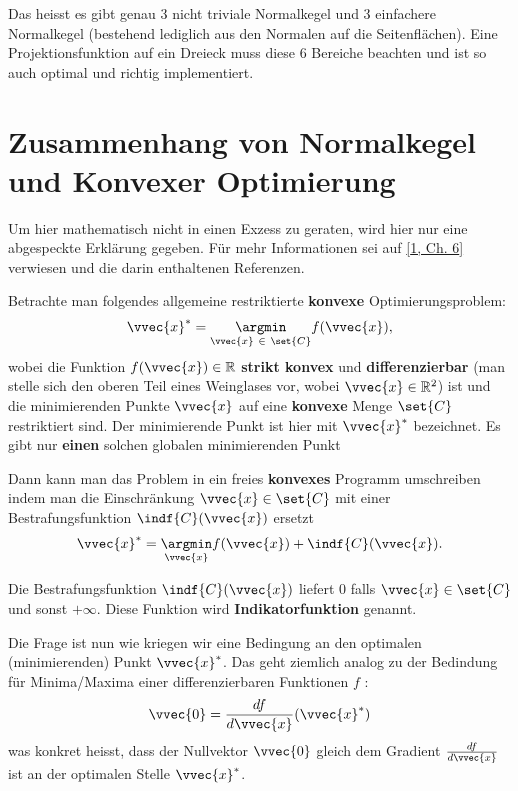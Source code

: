 \documentclass[
  12pt,
  british,
  a4paper,
  twoside,
  titlepage,
  openright,
  numbers=noenddot,
  chapterprefix=true,
  headings=optiontohead,
  svgnames,
  dvipsnames]{scrreprt}
\begin{document}
Das heisst es gibt genau 3 nicht triviale Normalkegel und 3 einfachere
Normalkegel (bestehend lediglich aus den Normalen auf die
Seitenflächen). Eine Projektionsfunktion auf ein Dreieck muss diese 6
Bereiche beachten und ist so auch optimal und richtig implementiert.

\hypertarget{zusammenhang-von-normalkegel-und-konvexer-optimierung}{%
\section{Zusammenhang von Normalkegel und Konvexer
Optimierung}\label{zusammenhang-von-normalkegel-und-konvexer-optimierung}}

Um hier mathematisch nicht in einen Exzess zu geraten, wird hier nur
eine abgespeckte Erklärung gegeben. Für mehr Informationen sei auf
\protect\hyperlink{ref-nuetzig_thesis_2016}{{[}1, Ch. 6{]}} verwiesen
und die darin enthaltenen Referenzen.

Betrachte man folgendes allgemeine restriktierte \textbf{konvexe}
Optimierungsproblem: \begin{align}
\vvec{x}^* = \underset{\vvec{x} \ \in \ \set{C}}{\argmin} f(\vvec{x}),
\label{eq:convexproblem}
\end{align} wobei die Funktion \(f(\vvec{x}) \in \mathbb{R}\)
\textbf{strikt konvex} und \textbf{differenzierbar} (man stelle sich den
oberen Teil eines Weinglases vor, wobei \(\vvec{x} \in \mathbb{R}^2\))
ist und die minimierenden Punkte \(\vvec{x}\) auf eine \textbf{konvexe}
Menge \(\set{C}\) restriktiert sind. Der minimierende Punkt ist hier mit
\(\vvec{x}^*\) bezeichnet. Es gibt nur \textbf{einen} solchen globalen
minimierenden Punkt

Dann kann man das Problem in ein freies \textbf{konvexes} Programm
umschreiben indem man die Einschränkung \(\vvec{x} \in \set{C}\) mit
einer Bestrafungsfunktion \(\indf{C}(\vvec{x})\) ersetzt \begin{align}
\vvec{x}^* = \underset{\vvec{x}}{\argmin} f(\vvec{x}) + \indf{C}(\vvec{x}).
\end{align}

Die Bestrafungsfunktion \(\indf{C}(\vvec{x})\) liefert \(0\) falls
\(\vvec{x} \in \set{C}\) und sonst \(+\infty\). Diese Funktion wird
\textbf{Indikatorfunktion} genannt.

Die Frage ist nun wie kriegen wir eine Bedingung an den optimalen
(minimierenden) Punkt \(\vvec{x}^*\). Das geht ziemlich analog zu der
Bedindung für Minima/Maxima einer differenzierbaren Funktionen \(f\) :
\begin{align}
\vvec{0} = \frac{df}{d\vvec{x}}(\vvec{x}^*)
\label{eq:optimality-difffunc}
\end{align} was konkret heisst, dass der Nullvektor \(\vvec{0}\) gleich
dem Gradient \(\frac{df}{d\vvec{x}}\) ist an der optimalen Stelle
\(\vvec{x}^*\).
\end{document}

